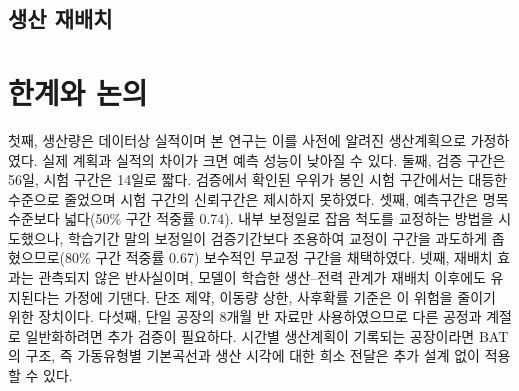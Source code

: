 \subsection{생산 재배치}

\section{한계와 논의}
첫째, 생산량은 데이터상 실적이며 본 연구는 이를 사전에 알려진 생산계획으로 가정하였다. 실제 계획과 실적의 차이가 크면 예측 성능이 낮아질 수 있다. 둘째, 검증 구간은 56일, 시험 구간은 14일로 짧다. 검증에서 확인된 우위가 봉인 시험 구간에서는 대등한 수준으로 줄었으며 시험 구간의 신뢰구간은 제시하지 못하였다. 셋째, 예측구간은 명목 수준보다 넓다(50\% 구간 적중률 0.74). 내부 보정일로 잡음 척도를 교정하는 방법을 시도했으나, 학습기간 말의 보정일이 검증기간보다 조용하여 교정이 구간을 과도하게 좁혔으므로(80\% 구간 적중률 0.67) 보수적인 무교정 구간을 채택하였다. 넷째, 재배치 효과는 관측되지 않은 반사실이며, 모델이 학습한 생산–전력 관계가 재배치 이후에도 유지된다는 가정에 기댄다. 단조 제약, 이동량 상한, 사후확률 기준은 이 위험을 줄이기 위한 장치이다. 다섯째, 단일 공장의 8개월 반 자료만 사용하였으므로 다른 공정과 계절로 일반화하려면 추가 검증이 필요하다. 시간별 생산계획이 기록되는 공장이라면 BAT의 구조, 즉 가동유형별 기본곡선과 생산 시각에 대한 희소 전달은 추가 설계 없이 적용할 수 있다.
